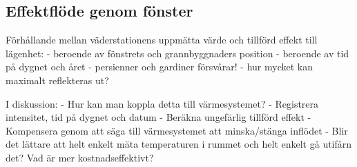 \subsection{Effektflöde genom fönster}

Förhållande mellan väderstationens uppmätta värde och tillförd effekt till lägenhet:
- beroende av fönstrets och grannbyggnaders position
- beroende av tid på dygnet och året
- persienner och gardiner försvårar!
- hur mycket kan maximalt reflekteras ut?

I diskussion:
- Hur kan man koppla detta till värmesystemet?
	- Registrera intensitet, tid på dygnet och datum
	- Beräkna ungefärlig tillförd effekt
	- Kompensera genom att säga till värmesystemet att minska/stänga inflödet
- Blir det lättare att helt enkelt mäta temperaturen i rummet och helt enkelt gå utifårn det? Vad är mer kostnadseffektivt?
